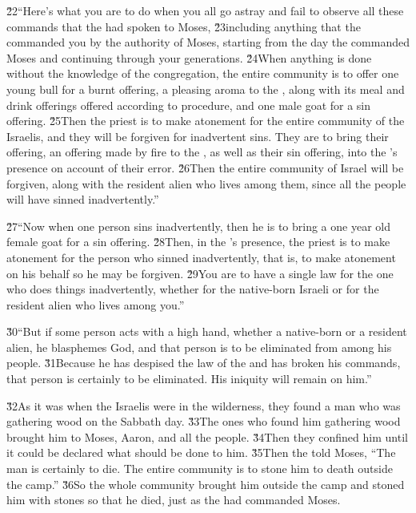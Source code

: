 \v{22}``Here's what you are to do when you all go astray and fail to observe all these commands that the  had spoken to Moses, \v{23}including anything that the  commanded you by the authority of Moses, starting from the day the  commanded Moses and continuing through your generations. \v{24}When anything is done without the knowledge of the congregation, the entire community is to offer one young bull for a burnt offering, a pleasing aroma to the , along with its meal and drink offerings offered according to procedure, and one male goat for a sin offering. \v{25}Then the priest is to make atonement for the entire community of the Israelis, and they will be forgiven for inadvertent sins. They are to bring their offering, an offering made by fire to the , as well as their sin offering, into the 's presence on account of their error. \v{26}Then the entire community of Israel will be forgiven, along with the resident alien who lives among them, since all the people will have sinned inadvertently.''

\v{27}``Now when one person sins inadvertently, then he is to bring a one year old female goat for a sin offering. \v{28}Then, in the 's presence, the priest is to make atonement for the person who sinned inadvertently, that is, to make atonement on his behalf so he may be forgiven. \v{29}You are to have a single law for the one who does things inadvertently, whether for the native-born Israeli or for the resident alien who lives among you.''

\v{30}``But if some person acts with a high hand, whether a native-born or a resident alien, he blasphemes God, and that person is to be eliminated from among his people. \v{31}Because he has despised the law of the  and has broken his commands, that person is certainly to be eliminated. His iniquity will remain on him.''

\v{32}As it was when the Israelis were in the wilderness, they found a man who was gathering wood on the Sabbath day. \v{33}The ones who found him gathering wood brought him to Moses, Aaron, and all the people. \v{34}Then they confined him until it could be declared what should be done to him. \v{35}Then the  told Moses, ``The man is certainly to die. The entire community is to stone him to death outside the camp.'' \v{36}So the whole community brought him outside the camp and stoned him with stones so that he died, just as the  had commanded Moses.

